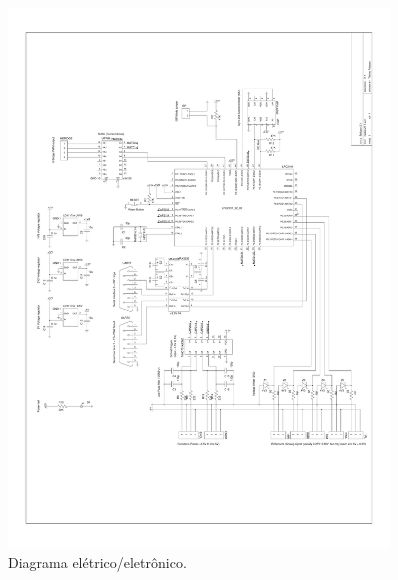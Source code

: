 \begin{figure}[htpb!]
  \centering
  \includegraphics[width=0.9\textwidth, keepaspectratio]{./figuras/hardware2_1.pdf}
  \caption{Diagrama elétrico/eletrônico.}
  \label{fig:diagrama_eletrico_eletronico}
\end{figure}



